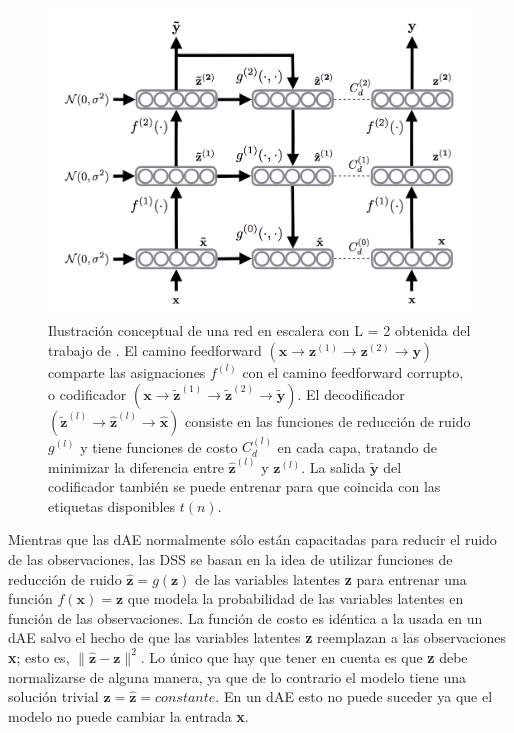 \begin{figure}[h!]
\begin{center}
\includegraphics[width=\textwidth]{images/ladder_architecture.png}
\caption{Ilustración conceptual de una red en escalera con L = 2 obtenida del trabajo de \cite{DBLP:journals/corr/RasmusVHBR15}. El camino feedforward $(\textbf{x}\rightarrow\textbf{z}^{(1)}\rightarrow\textbf{z}^{(2)}\rightarrow\textbf{y})$ comparte las asignaciones $f^{(l)}$ con el camino feedforward corrupto, o codificador $(\textbf{x}\rightarrow\tilde{\textbf{z}}^{(1)}\rightarrow\tilde{\textbf{z}}^{(2)}\rightarrow\tilde{\textbf{y}})$. El decodificador $(\tilde{\textbf{z}}^{(l)}\rightarrow\hat{\textbf{z}}^{(l)}\rightarrow\hat{\textbf{x}})$ consiste en las funciones de reducción de ruido $g^{(l)}$ y tiene funciones de costo $C_{d}^{(l)}$ en cada capa, tratando de minimizar la diferencia entre $\hat{\textbf{z}}^{(l)}$ y $\textbf{z}^{(l)}$.
La salida $\tilde{\textbf{y}}$ del codificador también se puede entrenar para que coincida con las etiquetas disponibles $t(n)$. }
\label{fig:ladder_architecture}
\end{center}
\end{figure}


Mientras que las dAE normalmente sólo están capacitadas para reducir el ruido de las observaciones, las DSS se basan en la idea de utilizar funciones de reducción de ruido $\hat{\textbf{z}} = g(\textbf{z})$ de las variables latentes \textbf{z} para entrenar una función $f(\textbf{x}) = \textbf{z}$ que modela la probabilidad de las variables latentes en función de las observaciones. La función de costo es idéntica a la usada en un dAE salvo el hecho de que las variables latentes \textbf{z} reemplazan a las observaciones \textbf{x}; esto es, $\|\hat{\textbf{z}} - \textbf{z}\|^2$. Lo único que hay que tener en cuenta es que \textbf{z} debe normalizarse de alguna manera, ya que de lo contrario el modelo tiene una solución trivial $\textbf{z} = \hat{\textbf{z}} = constante$. En un dAE esto no puede suceder ya que el modelo no puede cambiar la entrada \textbf{x}.

